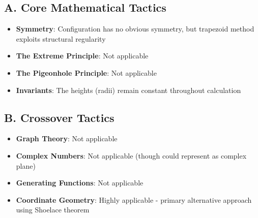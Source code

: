 \documentclass[]{article}
\begin{document}
\begin{tacticalbox}
\subsection*{A. Core Mathematical Tactics}
\begin{itemize}[leftmargin=*]
    \item \textbf{Symmetry}: Configuration has no obvious symmetry, but trapezoid method exploits structural regularity
    \item \textbf{The Extreme Principle}: Not applicable
    \item \textbf{The Pigeonhole Principle}: Not applicable
    \item \textbf{Invariants}: The heights (radii) remain constant throughout calculation
\end{itemize}

\subsection*{B. Crossover Tactics}
\begin{itemize}[leftmargin=*]
    \item \textbf{Graph Theory}: Not applicable
    \item \textbf{Complex Numbers}: Not applicable (though could represent as complex plane)
    \item \textbf{Generating Functions}: Not applicable
    \item \textbf{Coordinate Geometry}: Highly applicable - primary alternative approach using Shoelace theorem
\end{itemize}
\end{tacticalbox}
\end{document}
